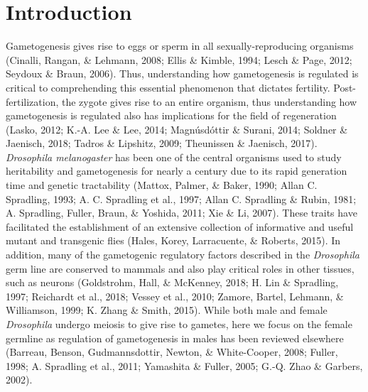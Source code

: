 \documentclass[12pt,oneside]{reedthesis}
\begin{document}
\hypertarget{introduction}{%
\section{Introduction}\label{introduction}}

Gametogenesis gives rise to eggs or sperm in all sexually-reproducing
organisms (Cinalli, Rangan, \& Lehmann, 2008; Ellis \& Kimble, 1994; Lesch \& Page, 2012; Seydoux \& Braun, 2006).
Thus, understanding how gametogenesis is regulated is critical to
comprehending this essential phenomenon that dictates fertility.
Post-fertilization, the zygote gives rise to an entire organism, thus
understanding how gametogenesis is regulated also has implications for
the field of regeneration (Lasko, 2012; K.-A. Lee \& Lee, 2014; Magnúsdóttir \& Surani, 2014; Soldner \& Jaenisch, 2018; Tadros \& Lipshitz, 2009; Theunissen \& Jaenisch, 2017).
\emph{Drosophila melanogaster} has been one of the central organisms used to
study heritability and gametogenesis for nearly a century due to its
rapid generation time and genetic tractability (Mattox, Palmer, \& Baker, 1990; Allan C. Spradling, 1993; A. C. Spradling et al., 1997; Allan C. Spradling \& Rubin, 1981; A. Spradling, Fuller, Braun, \& Yoshida, 2011; Xie \& Li, 2007). These traits have facilitated the establishment of an
extensive collection of informative and useful mutant and transgenic
flies (Hales, Korey, Larracuente, \& Roberts, 2015). In addition, many of the gametogenic regulatory
factors described in the \emph{Drosophila} germ line are conserved to mammals
and also play critical roles in other tissues, such as neurons
(Goldstrohm, Hall, \& McKenney, 2018; H. Lin \& Spradling, 1997; Reichardt et al., 2018; Vessey et al., 2010; Zamore, Bartel, Lehmann, \& Williamson, 1999; K. Zhang \& Smith, 2015). While both male and female \emph{Drosophila}
undergo meiosis to give rise to gametes, here we focus on the female
germline as regulation of gametogenesis in males has been reviewed
elsewhere (Barreau, Benson, Gudmannsdottir, Newton, \& White-Cooper, 2008; Fuller, 1998; A. Spradling et al., 2011; Yamashita \& Fuller, 2005; G.-Q. Zhao \& Garbers, 2002).
\end{document}
